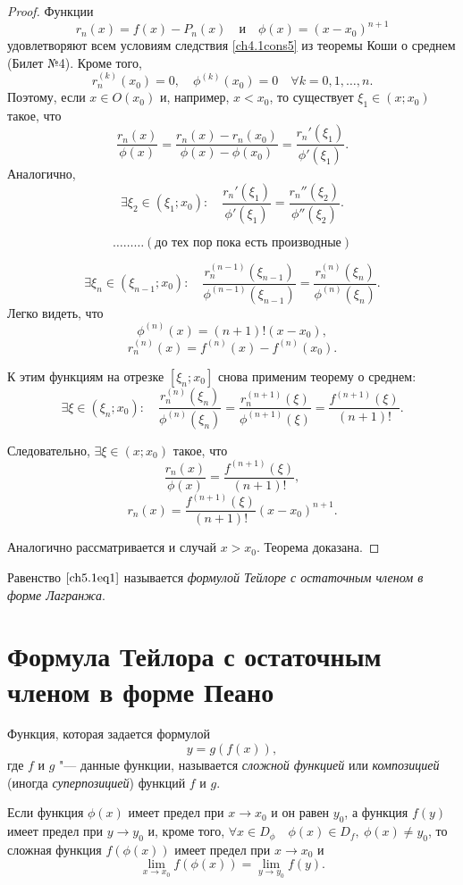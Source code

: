 \begin{proof}
Функции $$r_n(x) = f(x) - P_n(x) \quad \text{и} \quad \phi(x) = (x - x_0)^{n + 1}$$ удовлетворяют всем условиям следствия \ref{ch4.1cons5} из теоремы Коши о среднем (Билет №4). Кроме того, $$r_n^{(k)}(x_0) = 0, \quad \phi^{(k)}(x_0) = 0 \quad \forall k = 0,1,\ldots,n.$$ Поэтому, если $x \in O(x_0)$ и, например, $x < x_0$, то существует $\xi_1 \in (x; x_0)$ такое, что
$$
\frac{r_n(x)}{\phi(x)} = \frac{r_n(x) - r_n(x_0)}{\phi(x) - \phi(x_0)} = \frac{r_n'(\xi_1)}{\phi'(\xi_1)}.
$$
Аналогично,
$$
\exists \xi_2 \in (\xi_1; x_0): \quad \frac{r_n'(\xi_1)}{\phi'(\xi_1)} = \frac{r_n''(\xi_2)}{\phi''(\xi_2)}.
$$

$$\ldots\ldots\ldots (\text{до тех пор пока есть производные})$$

$$
\exists \xi_n \in (\xi_{n - 1}; x_0): \quad \frac{r_n^{(n - 1)}(\xi_{n - 1})}{\phi^{(n - 1)}(\xi_{n - 1})} = \frac{r_n^{(n)}(\xi_{n})}{\phi^{(n)}(\xi_{n})}.
$$
Легко видеть, что 
$$
\phi^{(n)}(x) = (n + 1)!(x - x_0),
$$
$$
r_n^{(n)}(x) = f^{(n)}(x) - f^{(n)}(x_0).
$$

К этим функциям на отрезке $[\xi_n; x_0]$ снова применим теорему о среднем:
$$
\exists \xi \in (\xi_n; x_0): \quad \frac{r_n^{(n)}(\xi_{n})}{\phi^{(n)}(\xi_{n})} = \frac{r_n^{(n + 1)}(\xi)}{\phi^{(n + 1)}(\xi)} = \frac{f^{(n + 1)}(\xi)}{(n + 1)!}.
$$

Следовательно, $\exists \xi \in (x; x_0)$ такое, что
$$
\frac{r_n(x)}{\phi(x)} = \frac{f^{(n + 1)}(\xi)}{(n + 1)!},
$$
$$
r_n(x) = \frac{f^{(n + 1)}(\xi)}{(n + 1)!}(x - x_0)^{n + 1}.
$$

Аналогично рассматривается и случай $x > x_0$. Теорема доказана.
\end{proof}

Равенство $\eqref{ch5.1eq1}$ называется \textit{формулой Тейлоре с остаточным членом в форме Лагранжа}.


\section{Формула Тейлора с остаточным членом в форме Пеано}


\begin{defn}
Функция, которая задается формулой 
$$
y = g(f(x)),
$$
где $f$ и $g$ "--- данные функции, называется \textit{сложной функцией} или \textit{композицией} (иногда \textit{суперпозицией}) функций $f$ и $g$.
\end{defn}

\begin{thm}
Если функция $\phi(x)$ имеет предел при $x \to x_0$ и он равен $y_0$, а функция $f(y)$ имеет предел при $y \to y_0$ и, кроме того, $\forall x \in D_\phi \quad \phi(x) \in D_f, \: \phi(x) \not= y_0$, то сложная функция $f(\phi(x))$ имеет предел при $x \to x_0$ и
\begin{equation} \label{ch5.1eq3}
\lim_{x \to x_0} f(\phi(x)) = \lim_{y \to y_0} f(y).
\end{equation}
\end{thm}

